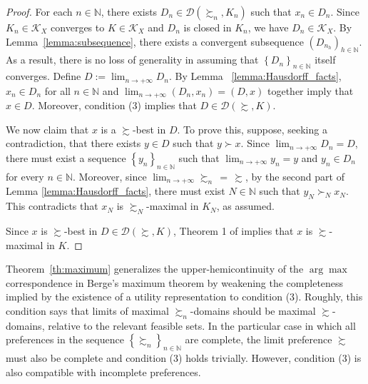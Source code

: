 \documentclass[12pt, oneside]{amsart}
\theoremstyle{definition}
\begin{document}
\begin{proof}
For each $n \in \mathbb{N}$, there exists $D_n \in \mathcal{D}\left(\succsim_n, K_n\right)$ such that $x_n \in D_n$. Since $K_n \in \mathcal{K}_X$ converges to $K \in \mathcal{K}_X$ and $D_n$ is closed in $K_n$, we have $D_n \in \mathcal{K}_X$. By Lemma~\ref{lemma:subsequence}, there exists a convergent subsequence $(D_{n_h})_{h \in \mathbb{N}}$. As a result, there is no loss of generality in assuming that $\left\{D_n\right\}_{n \in \mathbb{N}}$ itself converges. Define $D := \lim_{n \to +\infty} D_n$. By Lemma ~\ref{lemma:Hausdorff_facts}, $x_n \in D_n$ for all $n \in \mathbb{N}$ and $\lim_{n \to +\infty} (D_n, x_n) = (D, x)$ together imply that $x \in D$. Moreover, condition (3) implies that $D \in \mathcal{D}\left(\succsim, K\right)$.
	
We now claim that $x$ is a $\succsim$-best in $D$. To prove this, suppose, seeking a contradiction, that there exists $y \in D$ such that $y \succ x$. Since $\lim_{n \to +\infty} D_n = D$, there must exist a sequence $\left\{y_n\right\}_{n \in \mathbb{N}}$ such that $\lim_{n \to +\infty} y_n =y$ and $y_n \in D_n$ for every $n \in \mathbb{N}$. Moreover, since $\lim_{n \to +\infty}\succsim_n \hspace{2pt} = \hspace{2pt} \succsim$, by the second part of Lemma \ref{lemma:Hausdorff_facts}, there must exist $N \in \mathbb{N}$ such that $y_N \succ_N x_N$. This contradicts that $x_N$ is $\succsim_N$-maximal in $K_N$, as assumed.
	
Since $x$ is $\succsim$-best in $D \in \mathcal{D}\left(\succsim, K\right)$, Theorem 1 of \citet*{Gorno2018} implies that $x$ is $\succsim$-maximal in $K$.
\end{proof}

Theorem~\ref{th:maximum} generalizes the upper-hemicontinuity of the $\arg\max$ correspondence in Berge's maximum theorem by weakening the completeness implied by the existence of a utility representation to condition (3). Roughly, this condition says that limits of maximal $\succsim_n$-domains should be maximal $\succsim$-domains, relative to the relevant feasible sets. In the particular case in which all preferences in the sequence $\left\{\succsim_n\right\}_{n \in \mathbb{N}}$ are complete, the limit preference $\succsim$ must also be complete and condition (3) holds trivially. However, condition (3) is also compatible with incomplete preferences.
\end{document}
